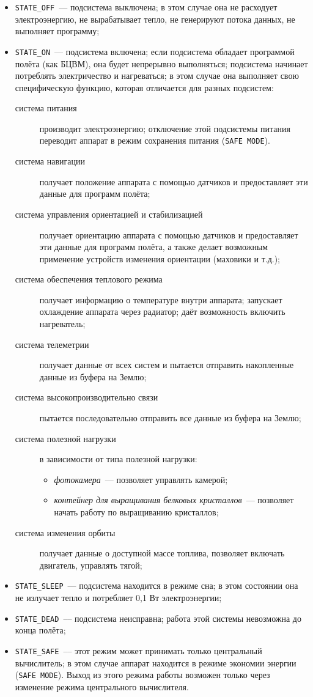 \documentclass[12pt,a4paper]{article}
\begin{document}
\begin{itemize}
\item \verb'STATE_OFF'~--- подсистема выключена; в этом случае она не расходует
  электроэнергию, не вырабатывает тепло, не генерируют потока данных, не выполняет
  программу;
\item \verb'STATE_ON'~--- подсистема включена; если подсистема обладает программой полёта
  (как БЦВМ), она будет непрерывно выполняться; подсистема начинает потреблять
  электричество и нагреваться; в этом случае она выполняет свою специфическую функцию,
  которая отличается для разных подсистем:
  \begin{description}
  \item[система питания] производит электроэнергию; отключение этой подсистемы питания
    переводит аппарат в режим сохранения питания (\verb'SAFE MODE').
  \item[система навигации] получает положение аппарата с помощью датчиков и предоставляет
    эти данные для программ полёта;
  \item[система управления ориентацией и стабилизацией] получает ориентацию аппарата с
    помощью датчиков и предоставляет эти данные для программ полёта, а также делает
    возможным применение устройств изменения ориентации (маховики и т.д.);
  \item[система обеспечения теплового режима] получает информацию о температуре внутри
    аппарата; запускает охлаждение аппарата через радиатор; даёт возможность включить
    нагреватель;
  \item[система телеметрии] получает данные от всех систем и пытается отправить
    накопленные данные из буфера на Землю;
  \item[система высокопроизводительно связи] пытается последовательно отправить все данные
    из буфера на Землю;
  \item[система полезной нагрузки] в зависимости от типа полезной нагрузки:
    \begin{itemize}
      \item \emph{фотокамера}~--- позволяет управлять камерой;  
      \item \emph{контейнер для выращивания белковых кристаллов}~--- позволяет начать работу по
        выращиванию кристаллов;
    \end{itemize}
  \item[система изменения орбиты] получает данные о доступной массе топлива, позволяет
    включать двигатель, управлять тягой;
  \end{description}
\item \verb'STATE_SLEEP'~--- подсистема находится в режиме сна; в этом состоянии она не
  излучает тепло и потребляет 0,1 Вт электроэнергии;
\item \verb'STATE_DEAD'~--– подсистема неисправна; работа этой системы невозможна до конца
  полёта;
\item \verb'STATE_SAFE'~--– этот режим может принимать только центральный вычислитель; в
  этом случае аппарат находится в режиме экономии энергии (\verb'SAFE MODE'). Выход из этого
  режима работы возможен только через изменение режима центрального вычислителя.
\end{itemize}
\end{document}
